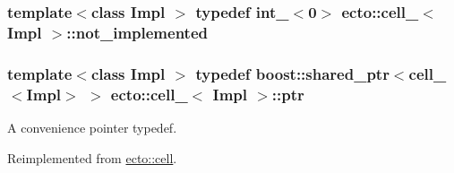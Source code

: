 \hypertarget{structecto_1_1cell___a3e48e52421d132bb2bb4e343f771abeb}{
\subsubsection[{not\-\_\-implemented}]{\setlength{\rightskip}{0pt plus 5cm}template$<$class Impl $>$ typedef {\bf int\-\_\-}$<$0$>$ {\bf ecto\-::cell\-\_\-}$<$ \-Impl $>$\-::{\bf not\-\_\-implemented}}}\label{structecto_1_1cell___a3e48e52421d132bb2bb4e343f771abeb}
\hypertarget{structecto_1_1cell___a26d9e255a2ba0335c5e90fd04efa6bfa}{
\subsubsection[{ptr}]{\setlength{\rightskip}{0pt plus 5cm}template$<$class Impl $>$ typedef boost\-::shared\-\_\-ptr$<${\bf cell\-\_\-}$<$\-Impl$>$ $>$ {\bf ecto\-::cell\-\_\-}$<$ \-Impl $>$\-::{\bf ptr}}}\label{structecto_1_1cell___a26d9e255a2ba0335c5e90fd04efa6bfa}


\-A convenience pointer typedef. 



\-Reimplemented from \hyperlink{structecto_1_1cell_af2cab9d2bc012088c4f58c40da57a862}{ecto\-::cell}.



